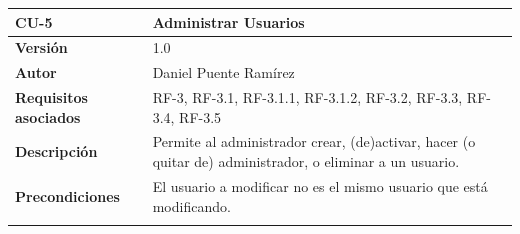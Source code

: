 \begin{longtable}[H]{@{}ll@{}}
\toprule
\begin{minipage}[b]{0.23\columnwidth}\raggedright\strut
\textbf{CU-5}\strut
\end{minipage} & \begin{minipage}[b]{0.71\columnwidth}\raggedright\strut
\textbf{Administrar Usuarios}\strut
\end{minipage}\tabularnewline
\midrule
\endhead
\begin{minipage}[t]{0.23\columnwidth}\raggedright\strut
\textbf{Versión}\strut
\end{minipage} & \begin{minipage}[t]{0.71\columnwidth}\raggedright\strut
1.0\strut
\end{minipage}\tabularnewline
\begin{minipage}[t]{0.23\columnwidth}\raggedright\strut
\textbf{Autor}\strut
\end{minipage} & \begin{minipage}[t]{0.71\columnwidth}\raggedright\strut
Daniel Puente Ramírez\strut
\end{minipage}\tabularnewline
\begin{minipage}[t]{0.23\columnwidth}\raggedright\strut
\textbf{Requisitos asociados}\strut
\end{minipage} & \begin{minipage}[t]{0.71\columnwidth}\raggedright\strut
RF-3, RF-3.1, RF-3.1.1, RF-3.1.2, RF-3.2, RF-3.3, RF-3.4, RF-3.5\strut
\end{minipage}\tabularnewline
\begin{minipage}[t]{0.23\columnwidth}\raggedright\strut
\textbf{Descripción}\strut
\end{minipage} & \begin{minipage}[t]{0.71\columnwidth}\raggedright\strut
Permite al administrador crear, (de)activar, hacer (o quitar de) administrador, o eliminar a un usuario.\strut
\end{minipage}\tabularnewline
\begin{minipage}[t]{0.23\columnwidth}\raggedright\strut
\textbf{Precondiciones}\strut
\end{minipage} & \begin{minipage}[t]{0.71\columnwidth}\raggedright\strut
El usuario a modificar no es el mismo usuario que está modificando.\strut
\end{minipage}\tabularnewline
\begin{minipage}[t]{0.23\columnwidth}\raggedright\strut

\end{minipage}
\end{longtable}
